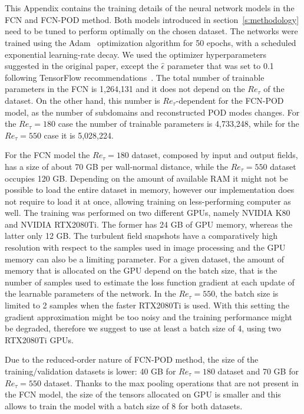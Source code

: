 \section{}\label{app:training}
This Appendix contains the training details of the neural network models in the FCN and FCN-POD method. Both models introduced in section~\ref{s:methodology} need to be tuned to perform optimally on the chosen dataset.
The networks were trained using the Adam~\citep{kingma2014adam} optimization algorithm for 50 epochs, with a scheduled exponential learning-rate decay.
We used the optimizer hyperparameters suggested in the original paper, except the $\hat{\epsilon}$ parameter that was set to 0.1 following TensorFlow recommendations~\citep{abadi2016tensorflow}.
The total number of trainable parameters in the FCN is 1,264,131 and it does not depend on the $Re_{\tau}$ of the dataset.
On the other hand, this number is $Re_{\tau}$-dependent for the FCN-POD model, as the number of subdomains and reconstructed POD modes changes.
For the $Re_{\tau}=180$ case the number of trainable parameters is 4,733,248, while for the $Re_{\tau}=550$ case it is 5,028,224.

For the FCN model the $Re_{\tau}=180$ dataset, composed by input and output fields, has a size of about 70 GB per wall-normal distance, while the $Re_{\tau}=550$ dataset occupies 120 GB.
Depending on the amount of available RAM it might not be possible to load the entire dataset in memory, however our implementation does not require to load it at once, allowing training on less-performing computer as well.
The training was performed on two different GPUs, namely NVIDIA K80 and NVIDIA RTX2080Ti.
The former has 24 GB of GPU memory, whereas the latter only 12 GB.
The turbulent field snapshots have a comparatively high resolution with respect to the samples used in image processing and the GPU memory can also be a limiting parameter.
For a given dataset, the amount of memory that is allocated on the GPU depend on the batch size, that is the number of samples used to estimate the loss function gradient at each update of the learnable parameters of the network.
In the $Re_{\tau}=550$, the batch size is limited to 2 samples when the faster RTX2080Ti is used. With this setting the gradient approximation might be too noisy and the training performance might be degraded, therefore we suggest to use at least a batch size of 4, using two RTX2080Ti GPUs.

Due to the reduced-order nature of FCN-POD method, the size of the training/validation datasets is lower: 40 GB for $Re_{\tau}=180$ dataset and 70 GB for $Re_{\tau}=550$ dataset.
Thanks to the max pooling operations that are not present in the FCN model, the size of the tensors allocated on GPU is smaller and this allows to train the model with a batch size of 8 for both datasets.

